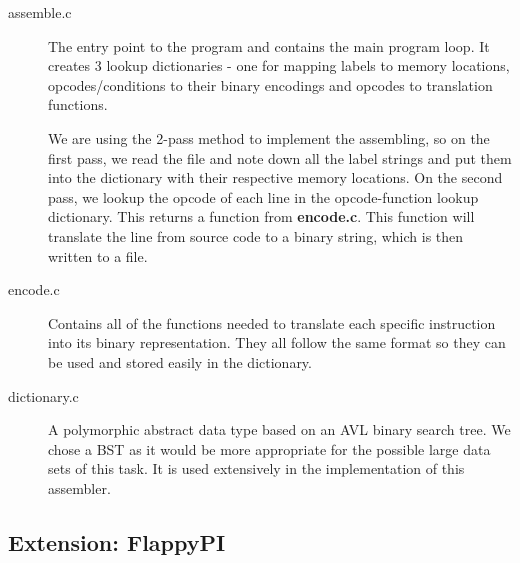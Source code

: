 \documentclass[11pt]{article}
\begin{document}
\begin{description}
\item[assemble.c]
The entry point to the program and contains the main program loop. It creates 3 lookup dictionaries - one for mapping labels to memory locations, opcodes/conditions to their binary encodings and opcodes to translation functions. 

We are using the 2-pass method to implement the assembling, so on the first pass, we read the file and note down all the label strings and put them into the dictionary with their respective memory locations. On the second pass, we lookup the opcode of each line in the opcode-function lookup dictionary. This returns a function from \textbf{encode.c}. This function will translate the line from source code to a binary string, which is then written to a file.

\item[encode.c]
Contains all of the functions needed to translate each specific instruction into its binary representation. They all follow the same format so they can be used and stored easily in the dictionary.

\item[dictionary.c]
A polymorphic abstract data type based on an AVL binary search tree. We chose a BST as it would be more appropriate for the possible large data sets of this task. It is used extensively in the implementation of this assembler.

\end{description}

\subsection{Extension: FlappyPI}
\end{document}

